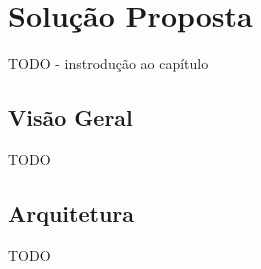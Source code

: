 \chapter{Solução Proposta}
\label{ch:4}

TODO - instrodução ao capítulo

\section{Visão Geral}
TODO

\section{Arquitetura}
TODO